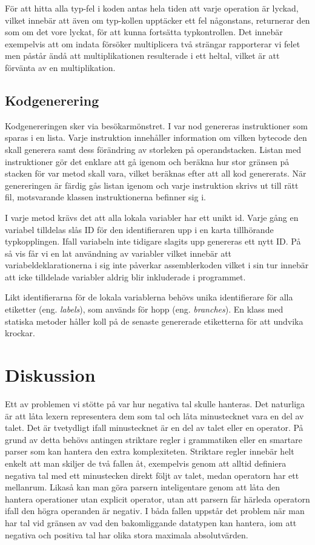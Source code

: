 \documentclass[a4paper,11pt]{article}
\newcommand{\trans}[2][eng.]{(#1 \emph{#2})}
\renewcommand{\*}[0]{\cdot}
\begin{document}
För att hitta alla typ-fel i koden antas hela tiden att varje operation är
lyckad, vilket innebär att även om typ-kollen upptäcker ett fel någonstans,
returnerar den som om det vore lyckat, för att kunna fortsätta typkontrollen.
Det innebär exempelvis att om indata försöker multiplicera två strängar
rapporterar vi felet men påstår ändå att multiplikationen resulterade i ett
heltal, vilket är att förvänta av en multiplikation.

\subsection*{Kodgenerering}

Kodgenereringen sker via besökarmönstret. I var nod genereras instruktioner som
sparas i en lista. Varje instruktion innehåller information om vilken bytecode
den skall generera samt dess förändring av storleken på operandstacken. Listan
med instruktioner gör det enklare att gå igenom och beräkna hur stor gränsen på
stacken för var metod skall vara, vilket beräknas efter att all kod genererats.
När genereringen är färdig gås listan igenom och varje instruktion skrivs ut
till rätt fil, motsvarande klassen instruktionerna befinner sig i.

I varje metod krävs det att alla lokala variabler har ett unikt id. Varje gång
en variabel tilldelas slås ID för den identifieraren upp i en karta tillhörande
typkopplingen. Ifall variabeln inte tidigare slagits upp genereras ett nytt ID.
På så vis får vi en lat användning av variabler vilket innebär att
variabeldeklarationerna i sig inte påverkar assemblerkoden vilket i sin tur
innebär att icke tilldelade variabler aldrig blir inkluderade i programmet.

Likt identifierarna för de lokala variablerna behövs unika identifierare för
alla etiketter \trans{labels}, som används för hopp \trans{branches}. En klass
med statiska metoder håller koll på de senaste genererade etiketterna för att
undvika krockar.

\section*{Diskussion}

Ett av problemen vi stötte på var hur negativa tal skulle hanteras. Det
naturliga är att låta lexern representera dem som tal och låta minustecknet
vara en del av talet. Det är tvetydligt ifall minustecknet är en del av talet
eller en operator. På grund av detta behövs antingen striktare regler i
grammatiken eller en smartare parser som kan hantera den extra komplexiteten.
Striktare regler innebär helt enkelt att man skiljer de två fallen åt,
exempelvis genom att alltid definiera negativa tal med ett minustecken direkt
följt av talet, medan operatorn har ett mellanrum. Likaså kan man göra parsern
inteligentare genom att låta den hantera operationer utan explicit operator,
utan att parsern får härleda operatorn ifall den högra operanden är negativ.
I båda fallen uppstår det problem när man har tal vid gränsen av vad den
bakomliggande datatypen kan hantera, iom att negativa och positiva tal har
olika stora maximala absolutvärden.
\end{document}
